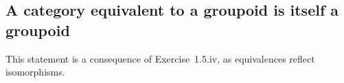 \subsection*{A category equivalent to a groupoid is itself a groupoid}

This statement is a consequence of Exercise~1.5.iv, as equivalences reflect isomorphisms.
